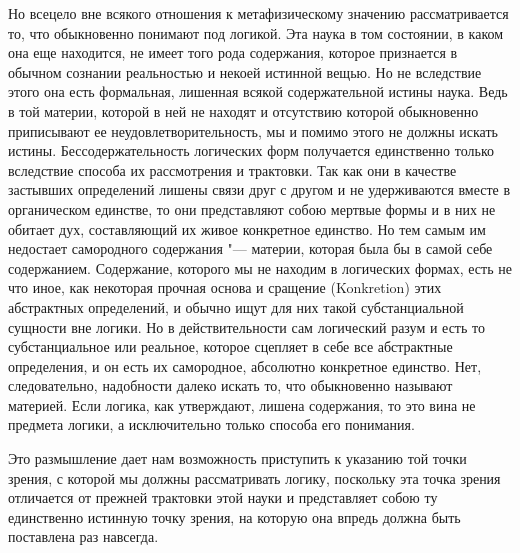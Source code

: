 Но всецело вне всякого отношения к метафизическому значению рассматривается
то, что обыкновенно понимают под логикой. Эта наука в том состоянии, в
каком она еще находится, не имеет того рода содержания, которое признается
в обычном сознании реальностью и некоей истинной вещью. Но не вследствие
этого она есть формальная, лишенная всякой содержательной истины наука.
Ведь в той материи, которой в ней не находят и отсутствию которой
обыкновенно приписывают ее неудовлетворительность, мы и помимо этого не
должны искать истины. Бессодержательность логических форм получается
единственно только вследствие способа их рассмотрения и трактовки. Так как
они в качестве застывших определений лишены связи друг с другом и не
удерживаются вместе в органическом единстве, то они представляют собою
мертвые формы и в них не обитает дух, составляющий их живое конкретное
единство. Но тем самым им недостает самородного содержания "--- материи,
которая была бы в самой себе содержанием. Содержание, которого мы не
находим в логических формах, есть не что иное, как некоторая прочная основа
и сращение (Konkretion) этих абстрактных определений, и обычно ищут для них
такой субстанциальной сущности вне логики. Но в действительности сам
логический разум и есть то субстанциальное или реальное, которое сцепляет в
себе все абстрактные определения, и он есть их самородное, абсолютно
конкретное единство. Нет, следовательно, надобности далеко искать то, что
обыкновенно называют материей. Если логика, как утверждают, лишена
содержания, то это вина не предмета логики, а исключительно только способа
его понимания.

Это размышление дает нам возможность приступить к указанию той точки зрения,
с которой мы должны рассматривать логику, поскольку эта точка зрения
отличается от прежней трактовки этой науки и представляет собою ту
единственно истинную точку зрения, на которую она впредь должна быть
поставлена раз навсегда.


